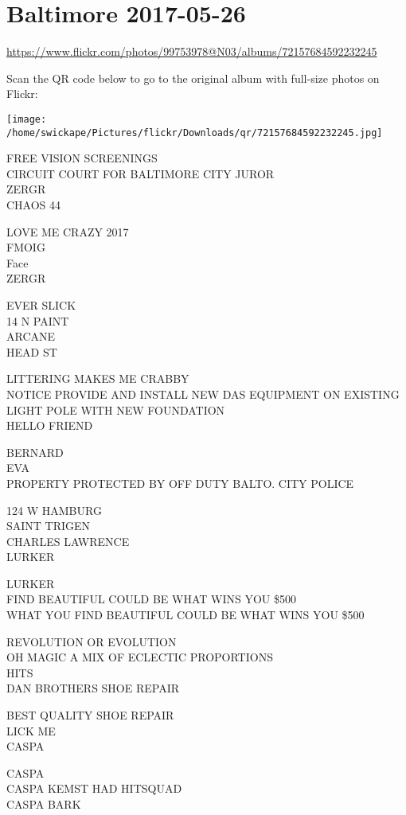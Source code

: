 \documentclass[10pt,letterpaper]{article}
\begin{document}
\section*{Baltimore 2017-05-26}

\url{https://www.flickr.com/photos/99753978@N03/albums/72157684592232245}

Scan the QR code below to go to the original album with full-size photos on Flickr:

\texttt{[image: /home/swickape/Pictures/flickr/Downloads/qr/72157684592232245.jpg]}


FREE VISION SCREENINGS\\
CIRCUIT COURT FOR BALTIMORE CITY JUROR\\
ZERGR\\
CHAOS 44

LOVE ME CRAZY 2017\\
FMOIG\\
Face\\
ZERGR

EVER SLICK\\
14 N PAINT\\
ARCANE\\
HEAD ST

LITTERING MAKES ME CRABBY\\
NOTICE PROVIDE AND INSTALL NEW DAS EQUIPMENT ON EXISTING LIGHT POLE WITH NEW FOUNDATION\\
HELLO FRIEND

BERNARD\\
EVA\\
PROPERTY PROTECTED BY OFF DUTY BALTO. CITY POLICE

124 W HAMBURG\\
SAINT TRIGEN\\
CHARLES LAWRENCE\\
LURKER

LURKER\\
FIND BEAUTIFUL COULD BE WHAT WINS YOU \$500\\
WHAT YOU FIND BEAUTIFUL COULD BE WHAT WINS YOU \$500

REVOLUTION OR EVOLUTION\\
OH MAGIC A MIX OF ECLECTIC PROPORTIONS\\
HITS\\
DAN BROTHERS SHOE REPAIR

BEST QUALITY SHOE REPAIR\\
LICK ME\\
CASPA

CASPA\\
CASPA KEMST HAD HITSQUAD\\
CASPA BARK
\end{document}
